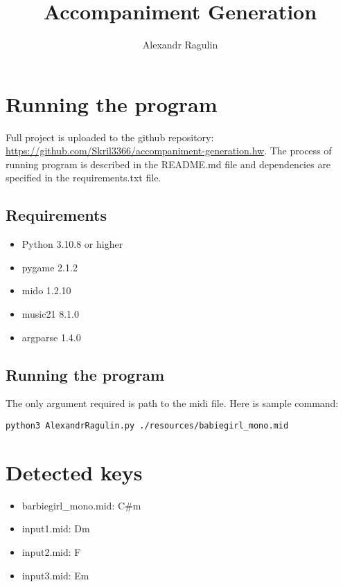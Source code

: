 \documentclass{article}
\title{Accompaniment Generation}
\author{Alexandr Ragulin}
\begin{document}
\maketitle

\section{Running the program}
Full project is uploaded to the github repository:
\href{https://github.com/Skril3366/accompaniment-generation.hw}{https://github.com/Skril3366/accompaniment-generation.hw}.
The process of running program is described in the README.md file and
dependencies are specified in the requirements.txt file.

\subsection{Requirements}

\begin{itemize}
  \item Python 3.10.8 or higher
  \item pygame 2.1.2
  \item mido 1.2.10
  \item music21 8.1.0
  \item argparse 1.4.0
\end{itemize}

\subsection{Running the program}

The only argument required is path to the midi file. Here is sample command:
\begin{verbatim}
python3 AlexandrRagulin.py ./resources/babiegirl_mono.mid
\end{verbatim}

\section{Detected keys}

\begin{itemize}
  \item barbiegirl\_mono.mid: C\#m
  \item input1.mid: Dm
  \item input2.mid: F
  \item input3.mid: Em
\end{itemize}
\end{document}
